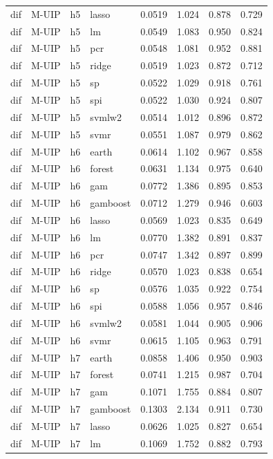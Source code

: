 \begin{ThreePartTable}
\begin{longtable}[t]{llclcccc}
dif & M-UIP & h5 & lasso & 0.0519 & 1.024 & 0.878 & 0.729\\
dif & M-UIP & h5 & lm & 0.0549 & 1.083 & 0.950 & 0.824\\
dif & M-UIP & h5 & pcr & 0.0548 & 1.081 & 0.952 & 0.881\\
dif & M-UIP & h5 & ridge & 0.0519 & 1.023 & 0.872 & 0.712\\
dif & M-UIP & h5 & sp & 0.0522 & 1.029 & 0.918 & 0.761\\
dif & M-UIP & h5 & spi & 0.0522 & 1.030 & 0.924 & 0.807\\
dif & M-UIP & h5 & svmlw2 & 0.0514 & 1.012 & 0.896 & 0.872\\
dif & M-UIP & h5 & svmr & 0.0551 & 1.087 & 0.979 & 0.862\\
\addlinespace
dif & M-UIP & h6 & earth & 0.0614 & 1.102 & 0.967 & 0.858\\
dif & M-UIP & h6 & forest & 0.0631 & 1.134 & 0.975 & 0.640\\
dif & M-UIP & h6 & gam & 0.0772 & 1.386 & 0.895 & 0.853\\
dif & M-UIP & h6 & gamboost & 0.0712 & 1.279 & 0.946 & 0.603\\
dif & M-UIP & h6 & lasso & 0.0569 & 1.023 & 0.835 & 0.649\\
dif & M-UIP & h6 & lm & 0.0770 & 1.382 & 0.891 & 0.837\\
dif & M-UIP & h6 & pcr & 0.0747 & 1.342 & 0.897 & 0.899\\
dif & M-UIP & h6 & ridge & 0.0570 & 1.023 & 0.838 & 0.654\\
dif & M-UIP & h6 & sp & 0.0576 & 1.035 & 0.922 & 0.754\\
dif & M-UIP & h6 & spi & 0.0588 & 1.056 & 0.957 & 0.846\\
dif & M-UIP & h6 & svmlw2 & 0.0581 & 1.044 & 0.905 & 0.906\\
dif & M-UIP & h6 & svmr & 0.0615 & 1.105 & 0.963 & 0.791\\
\addlinespace
dif & M-UIP & h7 & earth & 0.0858 & 1.406 & 0.950 & 0.903\\
dif & M-UIP & h7 & forest & 0.0741 & 1.215 & 0.987 & 0.704\\
dif & M-UIP & h7 & gam & 0.1071 & 1.755 & 0.884 & 0.807\\
dif & M-UIP & h7 & gamboost & 0.1303 & 2.134 & 0.911 & 0.730\\
dif & M-UIP & h7 & lasso & 0.0626 & 1.025 & 0.827 & 0.654\\
dif & M-UIP & h7 & lm & 0.1069 & 1.752 & 0.882 & 0.793\\

\end{longtable}
\end{ThreePartTable}
